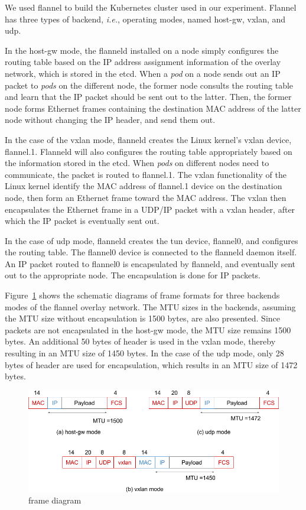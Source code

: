 We used flannel to build the Kubernetes cluster used in our experiment.
Flannel has three types of backend, {\it i.e.}, operating modes, named host-gw, vxlan, and udp\cite{CoreOSFlannelBackend}.

In the host-gw mode, the flanneld installed on a node simply configures the routing table 
based on the IP address assignment information of the overlay network, which is stored in the etcd. 
When a {\em pod} on a node sends out an IP packet to {\em pods} on the different node, 
the former node consults the routing table and learn that the IP packet should be sent out to the latter.
Then, the former node forms Ethernet frames containing the destination MAC address of the latter node 
without changing the IP header, and send them out.

In the case of the vxlan mode, flanneld creates the Linux kernel's vxlan device, flannel.1. 
Flanneld will also configures the routing table appropriately based on the information stored in the etcd.
When {\em pods} on different nodes need to communicate, the packet is routed to flannel.1.
The vxlan functionality of the Linux kernel identify the MAC address of flannel.1 device on the destination node,
then form an Ethernet frame toward the MAC address.
The vxlan then encapsulates the Ethernet frame in a UDP/IP packet with a vxlan header, after which the IP packet is eventually sent out.

In the case of udp mode, flanneld creates the tun device, flannel0, and configures the routing table.
The flannel0 device is connected to the flanneld daemon itself.
An IP packet routed to flannel0 is encapsulated by flanneld, and eventually sent out 
to the appropriate node. 
The encapsulation is done for IP packets.

Figure~\ref{fig:flannel-packet-diagram} shows the schematic diagrams of frame formats for three backends modes of the flannel overlay network. 
The MTU sizes in the backends, assuming the MTU size without encapsulation is 1500 bytes, are also presented.
Since packets are not encapsulated in the host-gw mode, the MTU size remains 1500 bytes.
An additional 50 bytes of header is used in the vxlan mode, thereby resulting in an MTU size of 1450 bytes.
In the case of the udp mode, only 28 bytes of header are used for encapsulation, which results in an MTU size of 1472 bytes.

\begin{figure}
\includegraphics[width=\columnwidth]{Figs/flannel-packet-diagram}
\caption{frame diagram}
\label{fig:flannel-packet-diagram}
\end{figure}

